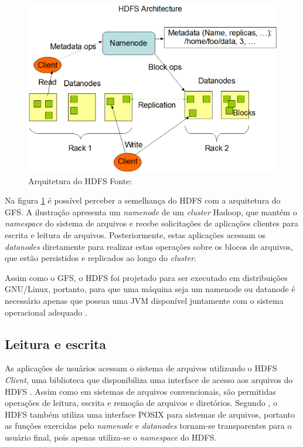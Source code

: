 \begin{figure}[ht!]
	\centering
	\includegraphics[keepaspectratio=true,scale=0.5]
	  {figuras/hdfs-arquitetura.eps}
	\caption[Arquitetura do HDFS]{Arquitetura do HDFS
	\protect\linebreak Fonte: \cite{hadoopSiteHDFS}}
	\label{fig-hdfs-arquitetura}
\end{figure}
\FloatBarrier

Na figura \ref{fig-hdfs-arquitetura} é possível perceber a semelhança do HDFS com a arquitetura do GFS. A ilustração apresenta um \textit{namenode} de um \textit{cluster} Hadoop, que mantém o \textit{namespace} do sistema de arquivos e recebe solicitações de aplicações clientes para escrita e leitura de arquivos. Posteriormente, estas aplicações acessam os \textit{datanodes} diretamente para realizar estas operações sobre os blocos de arquivos, que estão persistidos e replicados ao longo do \textit{cluster}.

Assim como o GFS, o HDFS foi projetado para ser executado em distribuições GNU/Linux, portanto, para que uma máquina seja um namenode ou datanode é necessário apenas que possua uma JVM disponível juntamente com o sistema operacional adequado \cite{hadoopSiteHDFS}.

\subsection{Leitura e escrita}

As aplicações de usuários acessam o sistema de arquivos utilizando o HDFS \textit{Client}, uma biblioteca que disponibiliza uma interface de acesso aos arquivos do HDFS \cite{shvachko2010}. Assim como em sistemas de arquivos convencionais, são permitidas operações de leitura, escrita e remoção de arquivos e diretórios. Segundo , o HDFS também utiliza uma interface POSIX para sistemas de arquivos, portanto as funções exercidas pelo \textit{namenode} e \textit{datanodes} tornam-se transparentes para o usuário final, pois apenas utiliza-se o \textit{namespace} do HDFS.

